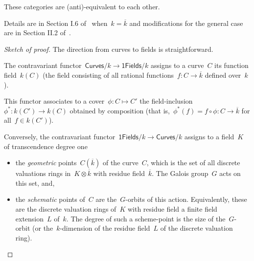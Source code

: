 \begin{theorem}
  These categories are (anti)-equivalent to each other.

  Details are in Section I.6 of~\cite{algebraic-geometry} when~$k = \overline{k}$ and modifications for the general case are in Section II.2 of~\cite{arithmetic-of-elliptic-curves}.

  \begin{proof}[Sketch of proof]
    The direction from curves to fields is straightforward.
    
    The contravariant functor~$\mathsf{Curves}/k \longrightarrow \mathsf{1Fields}/k$ assigns to a curve~$C$ its function field~$k(C)$ (the field consisting of all rational functions~$f\colon C \rightarrow \overline{k}$ defined over~$k$).
    
    This functor associates to a cover~$\phi\colon C \mapsto C'$ the field-inclusion~$\phi^{\ast}\colon k(C') \rightarrow k(C)$ obtained by composition (that is,~$\phi^{\ast}(f) = f \circ \phi\colon C \rightarrow \overline{k}$ for all~$f \in k(C')$).
    
    Conversely, the contravariant functor~$\mathsf{1Fields}/k \longrightarrow \mathsf{Curves}/k$ assigns to a field~$K$ of transcendence degree one
    
    \begin{itemize}
      \item the \emph{geometric} points~$C(\overline{k})$ of the curve~$C$, which is the set of all discrete valuations rings in~$K \otimes \overline{k}$ with residue field~$\overline{k}$. The Galois group~$G$ acts on this set, and,
      \item the \emph{schematic} points of~$C$ are the~$G$-orbits of this action. Equivalently, these are the discrete valuation rings of~$K$ with residue field a finite field extension~$L$ of~$k$. The degree of such a scheme-point is the size of the~$G$-orbit (or the~$k$-dimension of the residue field~$L$ of the discrete valuation ring).
    \end{itemize}
  \end{proof}
\end{theorem}

